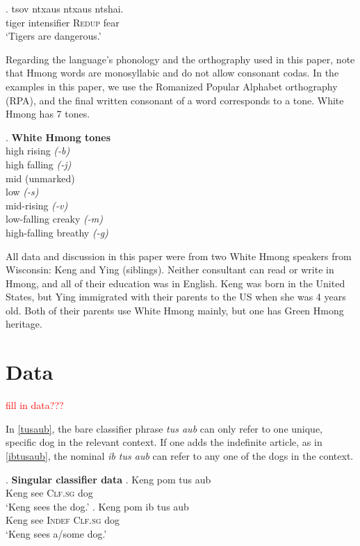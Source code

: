 \documentclass[a4paper,12pt,twoside]{article}
\begin{document}
\ex.	tsov ntxaus ntxaus ntshai.\\
	tiger intensifier \textsc{Redup} fear\\
	`Tigers are dangerous.'

Regarding the language's phonology and the orthography used in this paper, note that Hmong words are monosyllabic and do not allow consonant codas. In the examples in this paper, we use the Romanized Popular Alphabet orthography (RPA), and the final written consonant of a word corresponds to a tone. White Hmong has 7 tones.

\ex. \textbf{White Hmong tones} \\
	high rising \textit{(-b)}\\
	high falling \textit{(-j)}\\
	mid (unmarked)\\
	low \textit{(-s)}\\
	mid-rising \textit{(-v)}\\
	low-falling creaky \textit{(-m)}\\
	high-falling breathy \textit{(-g)}

All data and discussion in this paper were from two White Hmong speakers from Wisconsin: Keng and Ying (siblings). Neither consultant can read or write in Hmong, and all of their education was in English. Keng was born in the United States, but Ying immigrated with their parents to the US when she was 4 years old. Both of their parents use White Hmong mainly, but one has Green Hmong heritage. 

\section{Data}

\textcolor{red}{fill in data???}

In \ref{tusaub}, the bare classifier phrase \textit{tus aub} can only refer to one unique, specific dog in the relevant context. If one adds the indefinite article, as in \ref{ibtusaub}, the nominal \textit{ib tus aub} can refer to any one of the dogs in the context. 


\ex.	\textbf{Singular classifier data}
\ag. \label{tusaub}Keng pom tus aub\\
	Keng see \textsc{Clf.sg} dog\\
	`Keng sees the dog.'
\bg. \label{ibtusaub}Keng pom ib tus aub\\
	Keng see \textsc{Indef} \textsc{Clf.sg} dog\\
	`Keng sees a/some dog.'
\end{document}
